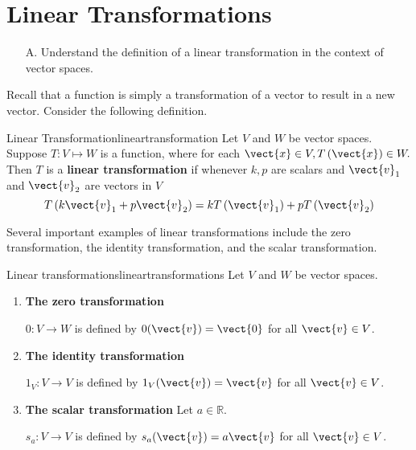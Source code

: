 \section{Linear Transformations}

\begin{outcome}
\begin{enumerate}
\item[A.] Understand the definition of a linear transformation in the context of vector spaces. 
\end{enumerate}
\end{outcome}

Recall that a function is simply a transformation of a vector to result in a new vector. Consider the following definition. 

\begin{definition}{Linear Transformation}{lineartransformation}
 Let $V$ and $W$ be vector spaces. Suppose $T: V \mapsto W$ is a function, where for each
$\vect{x} \in V ,T\left(\vect{x}\right)\in W.$ Then $T$ is a
\textbf{linear transformation} if whenever $k ,p $ are scalars and 
$\vect{v}_1$ and $\vect{v}_2$ are vectors in $V$
\begin{equation*}
T\left( k \vect{v}_1 + p \vect{v}_2 \right) = kT\left(\vect{v}_1\right)+ pT\left(\vect{v}_{2} \right)
\end{equation*}
\end{definition}

Several important examples of linear transformations include the zero transformation, the identity transformation, and the scalar transformation. 

\begin{example}{Linear transformations}{lineartransformations}
Let $V$ and $W$ be vector spaces.

\begin{enumerate}
\item \textbf{The zero transformation}

$0:V\to W$ is defined by $0(\vect{v})=\vect{0}$ for all $\vect{v}\in V$.


\item \textbf{The identity transformation}

$1_V:V\to V$ is defined by $1_V(\vect{v})=\vect{v}$ for all $\vect{v}\in V$.

\item \textbf{The scalar transformation}
Let $a\in\mathbb{R}$.

$s_a:V\to V$ is defined by $s_a(\vect{v})=a\vect{v}$ for all $\vect{v}\in V$.
\end{enumerate}
\end{example}

